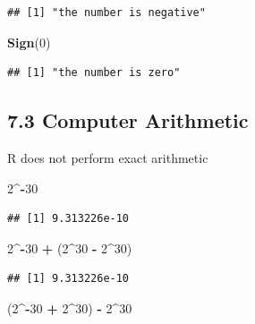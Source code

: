 \documentclass[]{article}
\newenvironment{Shaded}{\begin{snugshade}}{\end{snugshade}}
\newcommand{\KeywordTok}[1]{\textcolor[rgb]{0.13,0.29,0.53}{\textbf{#1}}}
\newcommand{\DecValTok}[1]{\textcolor[rgb]{0.00,0.00,0.81}{#1}}
\newcommand{\StringTok}[1]{\textcolor[rgb]{0.31,0.60,0.02}{#1}}
\newcommand{\OperatorTok}[1]{\textcolor[rgb]{0.81,0.36,0.00}{\textbf{#1}}}
\newcommand{\NormalTok}[1]{#1}
\begin{document}
\begin{verbatim}
## [1] "the number is negative"
\end{verbatim}

\begin{Shaded}
\begin{Highlighting}[]
\KeywordTok{Sign}\NormalTok{(}\DecValTok{0}\NormalTok{)}
\end{Highlighting}
\end{Shaded}

\begin{verbatim}
## [1] "the number is zero"
\end{verbatim}

\subsection{7.3 Computer Arithmetic}\label{computer-arithmetic}

R does not perform exact arithmetic

\begin{Shaded}
\begin{Highlighting}[]
\DecValTok{2}\OperatorTok{^-}\DecValTok{30}
\end{Highlighting}
\end{Shaded}

\begin{verbatim}
## [1] 9.313226e-10
\end{verbatim}

\begin{Shaded}
\begin{Highlighting}[]
\DecValTok{2}\OperatorTok{^-}\DecValTok{30} \OperatorTok{+}\StringTok{ }\NormalTok{(}\DecValTok{2}\OperatorTok{^}\DecValTok{30} \OperatorTok{-}\StringTok{ }\DecValTok{2}\OperatorTok{^}\DecValTok{30}\NormalTok{)}
\end{Highlighting}
\end{Shaded}

\begin{verbatim}
## [1] 9.313226e-10
\end{verbatim}

\begin{Shaded}
\begin{Highlighting}[]
\NormalTok{(}\DecValTok{2}\OperatorTok{^-}\DecValTok{30} \OperatorTok{+}\StringTok{ }\DecValTok{2}\OperatorTok{^}\DecValTok{30}\NormalTok{) }\OperatorTok{-}\StringTok{ }\DecValTok{2}\OperatorTok{^}\DecValTok{30}
\end{Highlighting}
\end{Shaded}
\end{document}
